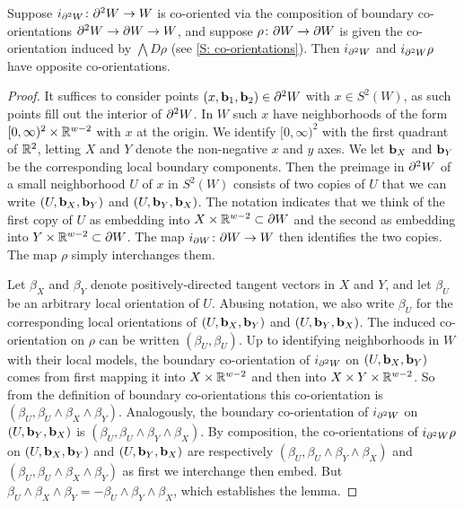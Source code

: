 \begin{lemma}\label{L: boundary2}
	Suppose $i_{\partial^2 W} \colon \partial^2 W \to W$ is co-oriented via the composition of boundary co-orientations $\partial^2 W \to \partial W \to W$, and suppose $\rho \colon \partial W \to \partial W$ is given the co-orientation induced by $\bigwedge D\rho$ (see \cref{S: co-orientations}).
	Then $i_{\partial^2 W}$ and $i_{\partial^2 W}\rho$ have opposite co-orientations.
\end{lemma}

\begin{proof}
	It suffices to consider points $(x,\mathbf{b}_1,\mathbf{b}_2) \in \partial^2 W$ with $x \in S^2(W)$, as such points fill out the interior of $\partial^2 W$.
	In $W$ such $x$ have neighborhoods of the form $[0,\infty)^2 \times \mathbb{R}^{w-2}$ with $x$ at the origin.
	We identify $[0,\infty)^2$ with the first quadrant of $\mathbb{R}^2$, letting $X$ and $Y$ denote the non-negative $x$ and $y$ axes.
	We let $\mathbf{b}_X$ and $\mathbf{b}_Y$ be the corresponding local boundary components.
	Then the preimage in $\partial^2 W$ of a small neighborhood $U$ of $x$ in $S^2(W)$ consists of two copies of $U$ that we can write $(U,\mathbf{b}_X,\mathbf{b}_Y)$ and $(U,\mathbf{b}_Y,\mathbf{b}_X)$.
	The notation indicates that we think of the first copy of $U$ as embedding into $X \times \mathbb{R}^{w-2} \subset \partial W$ and the second as embedding into $Y \times \mathbb{R}^{w-2} \subset \partial W$.
	The map $i_{\partial W} \colon \partial W \to W$ then identifies the two copies.
	The map $\rho$ simply interchanges them.

	Let $\beta_X$ and $\beta_Y$ denote positively-directed tangent vectors in $X$ and $Y$, and let $\beta_U$ be an arbitrary local orientation of $U$.
	Abusing notation, we also write $\beta_U$ for the corresponding local orientations of $(U,\mathbf{b}_X,\mathbf{b}_Y)$ and $(U,\mathbf{b}_Y,\mathbf{b}_X)$.
	The induced co-orientation on $\rho$ can be written $(\beta_U,\beta_U)$.
	Up to identifying neighborhoods in $W$ with their local models, the boundary co-orientation of $i_{\partial^2 W}$ on $(U,\mathbf{b}_X,\mathbf{b}_Y)$ comes from first mapping it into $X \times \mathbb{R}^{w-2}$ and then into $X \times Y \times \mathbb{R}^{w-2}$.
	So from the definition of boundary co-orientations this co-orientation is $(\beta_U, \beta_U \wedge \beta_X \wedge \beta_Y)$.
	Analogously, the boundary co-orientation of $i_{\partial^2 W}$ on $(U,\mathbf{b}_Y,\mathbf{b}_X)$ is $(\beta_U, \beta_U \wedge \beta_Y \wedge \beta_X)$.
	By composition, the co-orientations of $i_{\partial^2 W}\rho$ on $(U,\mathbf{b}_X,\mathbf{b}_Y)$ and $(U,\mathbf{b}_Y,\mathbf{b}_X)$ are respectively $(\beta_U, \beta_U \wedge \beta_Y \wedge \beta_X)$ and $(\beta_U, \beta_U \wedge \beta_X \wedge \beta_Y)$ as first we interchange then embed.
	But $\beta_U \wedge \beta_X \wedge \beta_Y = -\beta_U \wedge \beta_Y \wedge \beta_X$, which establishes the lemma.
\end{proof}

